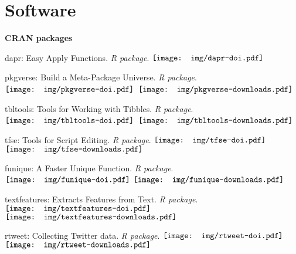 \section{Software}

  \textbf{CRAN packages}
    \begin{innerlist}

      \item dapr: Easy Apply Functions. \textit{R package}.
      \href{https://doi.org/10.5281/zenodo.2528504}{$\vcenter{\hbox{\texttt{[image: img/dapr-doi.pdf]}}}$}

      \item  pkgverse: Build a Meta-Package Universe. \textit{R package}.
      \href{https://zenodo.org/badge/latestdoi/136514892}{$\vcenter{\hbox{\texttt{[image: img/pkgverse-doi.pdf]}}}$}
      $\vcenter{\hbox{\texttt{[image: img/pkgverse-downloads.pdf]}}}$

      \item tbltools: Tools for Working with Tibbles. \textit{R package}.
      \href{https://zenodo.org/badge/latestdoi/152122857}{$\vcenter{\hbox{\texttt{[image: img/tbltools-doi.pdf]}}}$}
      $\vcenter{\hbox{\texttt{[image: img/tbltools-downloads.pdf]}}}$

      \item tfse: Tools for Script Editing. \textit{R package}.
      \href{https://zenodo.org/badge/latestdoi/62493045}{$\vcenter{\hbox{\texttt{[image: img/tfse-doi.pdf]}}}$}
      $\vcenter{\hbox{\texttt{[image: img/tfse-downloads.pdf]}}}$

      \item funique: A Faster Unique Function. \textit{R package}.
      \href{https://zenodo.org/badge/latestdoi/133566034}{$\vcenter{\hbox{\texttt{[image: img/funique-doi.pdf]}}}$}
      $\vcenter{\hbox{\texttt{[image: img/funique-downloads.pdf]}}}$

      \item textfeatures: Extracts Features from Text. \textit{R package}.
      \href{https://zenodo.org/badge/latestdoi/123046986}{$\vcenter{\hbox{\texttt{[image: img/textfeatures-doi.pdf]}}}$}
      $\vcenter{\hbox{\texttt{[image: img/textfeatures-downloads.pdf]}}}$

      \item rtweet: Collecting Twitter data. \textit{R package}.
      \href{https://zenodo.org/badge/latestdoi/64161359}{$\vcenter{\hbox{\texttt{[image: img/rtweet-doi.pdf]}}}$}
      $\vcenter{\hbox{\texttt{[image: img/rtweet-downloads.pdf]}}}$

    \end{innerlist}\vspace{1em}

